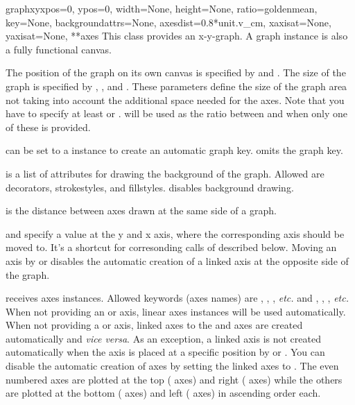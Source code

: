 \begin{classdesc}{graphxy}{xpos=0, ypos=0, width=None, height=None,
ratio=goldenmean, key=None, backgroundattrs=None,
axesdist=0.8*unit.v\_cm, xaxisat=None, yaxisat=None, **axes}
  This class provides an x-y-graph. A graph instance is also a fully
  functional canvas.

  The position of the graph on its own canvas is specified by
   and . The size of the graph is specified by
  , , and . These parameters define
  the size of the graph area not taking into account the additional
  space needed for the axes. Note that you have to specify at least
   or .  will be used as the ratio
  between  and  when only one of these is
  provided.

   can be set to a  instance to create
  an automatic graph key.  omits the graph key.

   is a list of attributes for drawing the
  background of the graph. Allowed are decorators, strokestyles, and
  fillstyles.  disables background drawing.

   is the distance between axes drawn at the same side
  of a graph.

   and  specify a value at the y and x axis,
  where the corresponding axis should be moved to. It's a shortcut for
  corresonding calls of  described below. Moving an
  axis by  or  disables the automatic
  creation of a linked axis at the opposite side of the graph.

   receives axes instances. Allowed keywords (axes names)
  are , , , \emph{etc.} and ,
  , , \emph{etc.} When not providing an  or
   axis, linear axes instances will be used automatically.
  When not providing a  or  axis, linked axes to the
   and  axes are created automatically and \emph{vice
  versa}. As an exception, a linked axis is not created automatically
  when the axis is placed at a specific position by  or
  . You can disable the automatic creation of axes by
  setting the linked axes to . The even numbered axes are
  plotted at the top ( axes) and right ( axes) while
  the others are plotted at the bottom ( axes) and left
  ( axes) in ascending order each.
\end{classdesc}

